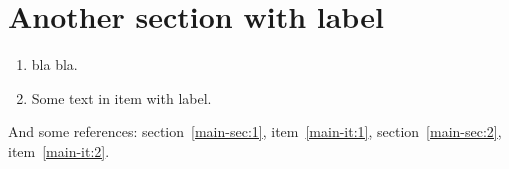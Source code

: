 \documentclass[../main]{subfiles}
\begin{document}
\section{Another section with label}\label{sec:2}
\begin{enumerate}
\item bla bla.
\item Some text in item with label.\label{it:2}
\end{enumerate}
And some references: section~\ref{main-sec:1}, item~\ref{main-it:1}, section~\ref{main-sec:2}, item~\ref{main-it:2}.
\end{document}
